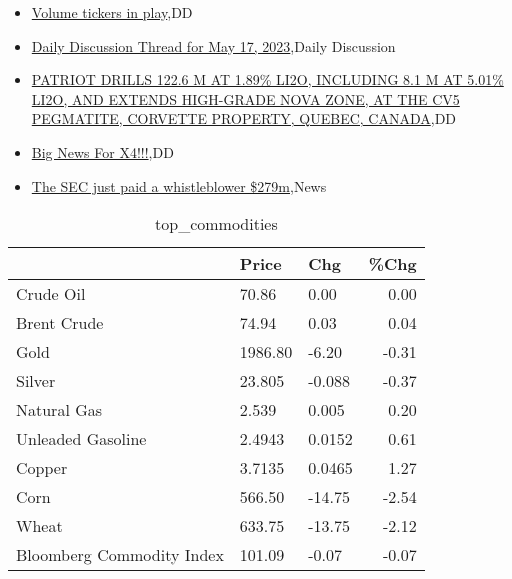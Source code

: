 \documentclass{article}%
\begin{document}
%
\begin{itemize}%
\item%
\href{https://reddit.com/r/wallstreetbets/comments/13jztkh/volume\_tickers\_in\_play/}{Volume tickers in play},DD%
\item%
\href{https://reddit.com/r/wallstreetbets/comments/13jxbfk/daily\_discussion\_thread\_for\_may\_17\_2023/}{Daily Discussion Thread for May 17, 2023},Daily Discussion%
\item%
\href{https://reddit.com/r/Baystreetbets/comments/13jkdak/patriot\_drills\_1226\_m\_at\_189\_li2o\_including\_81\_m/}{PATRIOT DRILLS 122.6 M AT 1.89\% LI2O, INCLUDING 8.1 M AT 5.01\% LI2O, AND EXTENDS HIGH-GRADE NOVA ZONE, AT THE CV5 PEGMATITE, CORVETTE PROPERTY, QUEBEC, CANADA},DD%
\item%
\href{https://reddit.com/r/Baystreetbets/comments/13j7s8e/big\_news\_for\_x4/}{Big News For X4!!!},DD%
\item%
\href{https://reddit.com/r/Economics/comments/13jy0rk/the\_sec\_just\_paid\_a\_whistleblower\_279m/}{The SEC just paid a whistleblower \$279m},News%
\end{itemize}%


\begin{table}[htbp]%
\caption{top\_commodities}%
\centering%
\begin{adjustbox}{width=1\textwidth}%
\begin{tabular}{lllr}
\toprule
                          &   Price &    Chg &  \%Chg \\
\midrule
               Crude Oil  &   70.86 &   0.00 &  0.00 \\
             Brent Crude  &   74.94 &   0.03 &  0.04 \\
                    Gold  & 1986.80 &  -6.20 & -0.31 \\
                  Silver  &  23.805 & -0.088 & -0.37 \\
             Natural Gas  &   2.539 &  0.005 &  0.20 \\
       Unleaded Gasoline  &  2.4943 & 0.0152 &  0.61 \\
                  Copper  &  3.7135 & 0.0465 &  1.27 \\
                    Corn  &  566.50 & -14.75 & -2.54 \\
                   Wheat  &  633.75 & -13.75 & -2.12 \\
Bloomberg Commodity Index &  101.09 &  -0.07 & -0.07 \\
\bottomrule
\end{tabular}
%
\end{adjustbox}%
\end{table}
\end{document}
